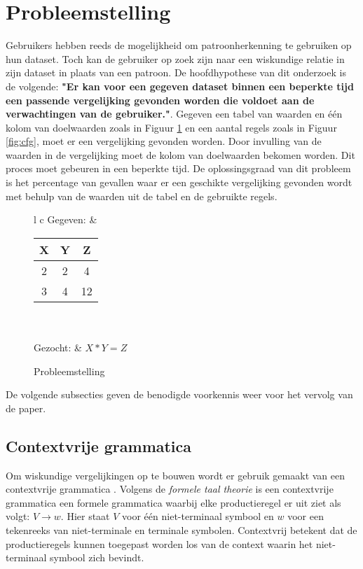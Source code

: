 \documentclass[Main.tex]{subfiles}
\begin{document}
\section{Probleemstelling}
Gebruikers hebben reeds de mogelijkheid om patroonherkenning te gebruiken op hun dataset. Toch kan de gebruiker op zoek zijn naar een wiskundige relatie in zijn dataset in plaats van een patroon. De hoofdhypothese van dit onderzoek is de volgende: \textbf{"Er kan voor een gegeven dataset binnen een beperkte tijd een passende vergelijking gevonden worden die voldoet aan de verwachtingen van de gebruiker."}. Gegeven een tabel van waarden en \'e\'en kolom van doelwaarden zoals in Figuur \ref{fig:psvb} en een aantal regels zoals in Figuur \ref{fig:cfg}, moet er een vergelijking gevonden worden. Door invulling van de waarden in de vergelijking moet de kolom van doelwaarden bekomen worden. Dit proces moet gebeuren in een beperkte tijd. De oplossingsgraad van dit probleem is het percentage van gevallen waar er een geschikte vergelijking gevonden wordt met behulp van de waarden uit de tabel en de gebruikte regels.

\begin{figure}[!htb]
\centering
\begin{framed}
\begin{tabular}{l c}
Gegeven: &
\begin{tabular}{| c | c | | c |}
\hline
X & Y & Z \\ \hline
2 & 2 & 4 \\ \hline
3 & 4 &12 \\ \hline
\end{tabular} \\ \\
Gezocht: & $X*Y = Z$
\end{tabular}
\end{framed}
\caption{Probleemstelling}
\label{fig:psvb}
\end{figure}

\par De volgende subsecties geven de benodigde voorkennis weer voor het vervolg van de paper.

\subsection{Contextvrije grammatica}
Om wiskundige vergelijkingen op te bouwen wordt er gebruik gemaakt van een contextvrije grammatica \cite{equationDisc}. Volgens de \textit{formele taal theorie} \cite{cfg} is een contextvrije grammatica een formele grammatica waarbij elke productieregel er uit ziet als volgt: $V \rightarrow w$. Hier staat $V$  voor \'e\'en niet-terminaal symbool en $w$ voor een tekenreeks van niet-terminale en terminale symbolen. Contextvrij betekent dat de productieregels kunnen toegepast worden los van de context waarin het niet-terminaal symbool zich bevindt.
\end{document}
